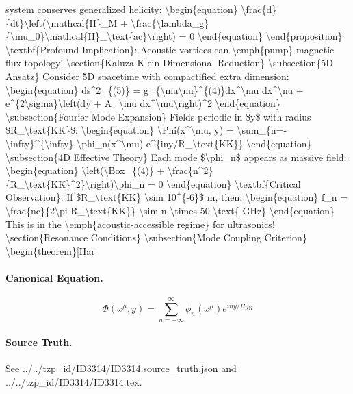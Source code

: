 system conserves generalized helicity: \textbackslash{}begin\{equation\} \textbackslash{}frac\{d\}\{dt\}\textbackslash{}left(\textbackslash{}mathcal\{H\}\_M + \textbackslash{}frac\{\textbackslash{}lambda\_g\}\{\textbackslash{}mu\_0\}\textbackslash{}mathcal\{H\}\_\textbackslash{}text\{ac\}\textbackslash{}right) = 0 \textbackslash{}end\{equation\} \textbackslash{}end\{proposition\} \textbackslash{}textbf\{Profound Implication\}: Acoustic vortices can \textbackslash{}emph\{pump\} magnetic flux topology! \textbackslash{}section\{Kaluza-Klein Dimensional Reduction\} \textbackslash{}subsection\{5D Ansatz\} Consider 5D spacetime with compactified extra dimension: \textbackslash{}begin\{equation\} ds\textasciicircum{}2\_\{(5)\} = g\_\{\textbackslash{}mu\textbackslash{}nu\}\textasciicircum{}\{(4)\}dx\textasciicircum{}\textbackslash{}mu dx\textasciicircum{}\textbackslash{}nu + e\textasciicircum{}\{2\textbackslash{}sigma\}\textbackslash{}left(dy + A\_\textbackslash{}mu dx\textasciicircum{}\textbackslash{}mu\textbackslash{}right)\textasciicircum{}2 \textbackslash{}end\{equation\} \textbackslash{}subsection\{Fourier Mode Expansion\} Fields periodic in \$y\$ with radius \$R\_\textbackslash{}text\{KK\}\$: \textbackslash{}begin\{equation\} \textbackslash{}Phi(x\textasciicircum{}\textbackslash{}mu, y) = \textbackslash{}sum\_\{n=-\textbackslash{}infty\}\textasciicircum{}\{\textbackslash{}infty\} \textbackslash{}phi\_n(x\textasciicircum{}\textbackslash{}mu) e\textasciicircum{}\{iny/R\_\textbackslash{}text\{KK\}\} \textbackslash{}end\{equation\} \textbackslash{}subsection\{4D Effective Theory\} Each mode \$\textbackslash{}phi\_n\$ appears as massive field: \textbackslash{}begin\{equation\} \textbackslash{}left(\textbackslash{}Box\_\{(4)\} + \textbackslash{}frac\{n\textasciicircum{}2\}\{R\_\textbackslash{}text\{KK\}\textasciicircum{}2\}\textbackslash{}right)\textbackslash{}phi\_n = 0 \textbackslash{}end\{equation\} \textbackslash{}textbf\{Critical Observation\}: If \$R\_\textbackslash{}text\{KK\} \textbackslash{}sim 10\textasciicircum{}\{-6\}\$ m, then: \textbackslash{}begin\{equation\} f\_n = \textbackslash{}frac\{nc\}\{2\textbackslash{}pi R\_\textbackslash{}text\{KK\}\} \textbackslash{}sim n \textbackslash{}times 50 \textbackslash{}text\{ GHz\} \textbackslash{}end\{equation\} This is in the \textbackslash{}emph\{acoustic-accessible regime\} for ultrasonics! \textbackslash{}section\{Resonance Conditions\} \textbackslash{}subsection\{Mode Coupling Criterion\} \textbackslash{}begin\{theorem\}[Har

\paragraph{Canonical Equation.}
\[
\begin{equation} \Phi(x^ \mu, y) = \sum_{n=- \infty}^{ \infty} \phi_n(x^ \mu) e^{iny/R_ \text{KK}} \end{equation}
\]

\paragraph{Source Truth.}
See ../../tzp\_id/ID3314/ID3314.source\_truth.json and ../../tzp\_id/ID3314/ID3314.tex.
